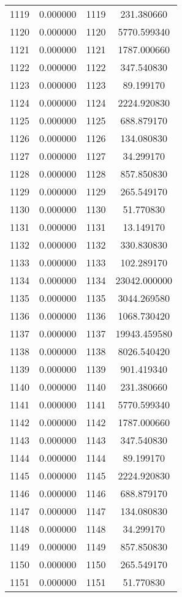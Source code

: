 \documentclass[12pt]{article}
\begin{document}
\begin{longtable}{@{}cccc@{}}
1119 & 0.000000 & 1119 & 231.380660 \\
1120 & 0.000000 & 1120 & 5770.599340 \\
1121 & 0.000000 & 1121 & 1787.000660 \\
1122 & 0.000000 & 1122 & 347.540830 \\
1123 & 0.000000 & 1123 & 89.199170 \\
1124 & 0.000000 & 1124 & 2224.920830 \\
1125 & 0.000000 & 1125 & 688.879170 \\
1126 & 0.000000 & 1126 & 134.080830 \\
1127 & 0.000000 & 1127 & 34.299170 \\
1128 & 0.000000 & 1128 & 857.850830 \\
1129 & 0.000000 & 1129 & 265.549170 \\
1130 & 0.000000 & 1130 & 51.770830 \\
1131 & 0.000000 & 1131 & 13.149170 \\
1132 & 0.000000 & 1132 & 330.830830 \\
1133 & 0.000000 & 1133 & 102.289170 \\
1134 & 0.000000 & 1134 & 23042.000000 \\
1135 & 0.000000 & 1135 & 3044.269580 \\
1136 & 0.000000 & 1136 & 1068.730420 \\
1137 & 0.000000 & 1137 & 19943.459580 \\
1138 & 0.000000 & 1138 & 8026.540420 \\
1139 & 0.000000 & 1139 & 901.419340 \\
1140 & 0.000000 & 1140 & 231.380660 \\
1141 & 0.000000 & 1141 & 5770.599340 \\
1142 & 0.000000 & 1142 & 1787.000660 \\
1143 & 0.000000 & 1143 & 347.540830 \\
1144 & 0.000000 & 1144 & 89.199170 \\
1145 & 0.000000 & 1145 & 2224.920830 \\
1146 & 0.000000 & 1146 & 688.879170 \\
1147 & 0.000000 & 1147 & 134.080830 \\
1148 & 0.000000 & 1148 & 34.299170 \\
1149 & 0.000000 & 1149 & 857.850830 \\
1150 & 0.000000 & 1150 & 265.549170 \\
1151 & 0.000000 & 1151 & 51.770830 \\

\end{longtable}
\end{document}
